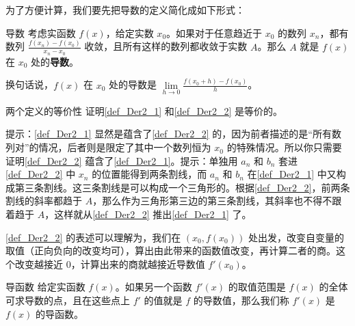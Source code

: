 



为了方便计算，我们要先把导数的定义简化成如下形式：

\begin{definition}{导数}\label{def_Der2_2}
考虑实函数 $f(x)$，给定实数 $x_0$。如果对于任意趋近于 $x_0$ 的数列 $x_n$，都有数列 $\frac{f(x_n)-f(x_0)}{x_n-x_0}$ 收敛，且所有这样的数列都收敛于实数 $A$。那么 $A$ 就是 $f(x)$ 在 $x_0$ 处的\textbf{导数}。

换句话说，$f(x)$ 在 $x_0$ 处的导数是 $\lim\limits_{h\to 0}\frac{f(x_0+h)-f(x_0)}{h}$。
\end{definition}

\begin{exercise}{两个定义的等价性}
证明\autoref{def_Der2_1} 和\autoref{def_Der2_2} 是等价的。

提示：\autoref{def_Der2_1} 显然是蕴含了\autoref{def_Der2_2} 的，因为前者描述的是“所有数列对”的情况，后者则是限定了其中一个数列恒为 $x_0$ 的特殊情况。所以你只需要证明\autoref{def_Der2_2} 蕴含了\autoref{def_Der2_1}。提示：单独用 $a_n$ 和 $b_n$ 套进\autoref{def_Der2_2} 中 $x_n$ 的位置能得到两条割线，而 $a_n$ 和 $b_n$ 在\autoref{def_Der2_1} 中又构成第三条割线。这三条割线是可以构成一个三角形的。根据\autoref{def_Der2_2}，前两条割线的斜率都趋于 $A$，那么作为三角形第三边的第三条割线，其斜率也不得不跟着趋于 $A$，这样就从\autoref{def_Der2_2} 推出\autoref{def_Der2_1} 了。
\end{exercise}


\autoref{def_Der2_2} 的表述可以理解为，我们在 $(x_0, f(x_0))$ 处出发，改变自变量的取值（正向负向的改变均可），算出由此带来的函数值改变，再计算二者的商。这个改变越接近 $0$，计算出来的商就越接近导数值 $f'(x_0)$。

\begin{definition}{导函数}
给定实函数 $f(x)$。如果另一个函数 $f'(x)$ 的取值范围是 $f(x)$ 的全体可求导数的点，且在这些点上 $f'$ 的值就是 $f$ 的导数值，那么我们称 $f'(x)$ 是 $f(x)$ 的导函数。
\end{definition}


